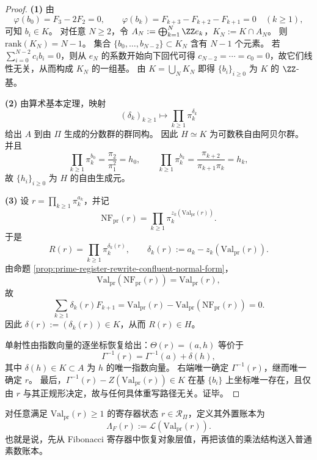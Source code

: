 \begin{proof}
\textbf{(1)} 由
\[
\varphi(b_0)=F_3-2F_2=0,
\qquad
\varphi(b_k)=F_{k+3}-F_{k+2}-F_{k+1}=0\quad(k\ge1),
\]
可知 \(b_i\in K\)。
对任意 \(N\ge2\)，令 \(A_N:=\bigoplus_{k=1}^{N}\ZZ e_k\)，\(K_N:=K\cap A_N\)。
则 \(\mathrm{rank}(K_N)=N-1\)。
集合 \(\{b_0,\dots,b_{N-2}\}\subset K_N\) 含有 \(N-1\) 个元素。
若 \(\sum_{i=0}^{N-2}c_i b_i=0\)，则从 \(e_N\) 的系数开始向下回代可得 \(c_{N-2}=\cdots=c_0=0\)，故它们线性无关，从而构成 \(K_N\) 的一组基。
由 \(K=\bigcup_{N}K_N\) 即得 \(\{b_i\}_{i\ge0}\) 为 \(K\) 的 \(\ZZ\)-基。

\textbf{(2)} 由算术基本定理，映射
\[
(\delta_k)_{k\ge1}\longmapsto \prod_{k\ge1}\pi_k^{\delta_k}
\]
给出 \(A\) 到由 \(\Pi\) 生成的分数群的群同构。
因此 \(H\simeq K\) 为可数秩自由阿贝尔群。
并且
\[
\prod_{k\ge1}\pi_k^{b_0}=\frac{\pi_2}{\pi_1^2}=h_0,
\qquad
\prod_{k\ge1}\pi_k^{b_k}=\frac{\pi_{k+2}}{\pi_{k+1}\pi_k}=h_k,
\]
故 \(\{h_i\}_{i\ge0}\) 为 \(H\) 的自由生成元。

\textbf{(3)} 设 \(r=\prod_{k\ge1}\pi_k^{a_k}\)，并记
\[
\mathrm{NF}_{\mathrm{pr}}(r)=\prod_{k\ge1}\pi_k^{z_k(\mathrm{Val}_{\mathrm{pr}}(r))}.
\]
于是
\[
R(r)=\prod_{k\ge1}\pi_k^{\delta_k(r)},
\qquad
\delta_k(r):=a_k-z_k(\mathrm{Val}_{\mathrm{pr}}(r)).
\]
由命题 \ref{prop:prime-register-rewrite-confluent-normal-form}，
\[
\mathrm{Val}_{\mathrm{pr}}(\mathrm{NF}_{\mathrm{pr}}(r))=\mathrm{Val}_{\mathrm{pr}}(r),
\]
故
\[
\sum_{k\ge1}\delta_k(r)F_{k+1}
=\mathrm{Val}_{\mathrm{pr}}(r)-\mathrm{Val}_{\mathrm{pr}}(\mathrm{NF}_{\mathrm{pr}}(r))
=0.
\]
因此 \(\delta(r):=(\delta_k(r))\in K\)，从而 \(R(r)\in H\)。

单射性由指数向量的逐坐标恢复给出：\(\Theta(r)=(a,h)\) 等价于
\[
\Gamma^{-1}(r)=\Gamma^{-1}(a)+\delta(h),
\]
其中 \(\delta(h)\in K\subset A\) 为 \(h\) 的唯一指数向量。
右端唯一确定 \(\Gamma^{-1}(r)\)，继而唯一确定 \(r\)。
最后，\(\Gamma^{-1}(r)-Z(\mathrm{Val}_{\mathrm{pr}}(r))\in K\) 在基 \(\{b_i\}\) 上坐标唯一存在，且仅由 \(r\) 与其正规形决定，故与任何具体重写路径无关。证毕。
\end{proof}

\begin{definition}\label{def:prime-register-external-ledger}
对任意满足 \(\mathrm{Val}_{\mathrm{pr}}(r)\ge1\) 的寄存器状态 \(r\in\mathcal R_{\Pi}\)，定义其外置账本为
\[
\Lambda_F(r):=\mathcal L(\mathrm{Val}_{\mathrm{pr}}(r)).
\]
也就是说，先从 Fibonacci 寄存器中恢复对象层值，再把该值的乘法结构送入普通素数账本。
\end{definition}

